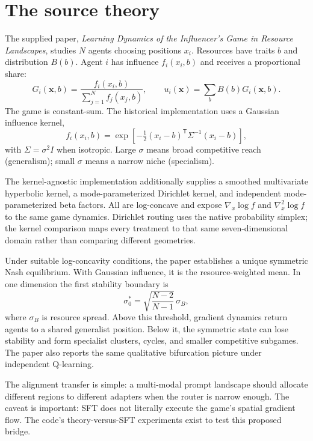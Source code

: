 \documentclass[11pt]{article}
\begin{document}
\section{The source theory}
The supplied paper, \emph{Learning Dynamics of the Influencer's Game in Resource
Landscapes}, studies $N$ agents choosing positions $x_i$. Resources have traits $b$ and
distribution $B(b)$. Agent $i$ has influence $f_i(x_i,b)$ and receives a proportional
share:
\begin{equation}
G_i(\mathbf{x},b)=\frac{f_i(x_i,b)}{\sum_{j=1}^{N}f_j(x_j,b)},\qquad
u_i(\mathbf{x})=\sum_b B(b)G_i(\mathbf{x},b).
\label{eq:game}
\end{equation}
The game is constant-sum. The historical implementation uses a Gaussian
influence kernel,
\begin{equation}
f_i(x_i,b)=\exp\!\left[-\tfrac12(x_i-b)^\mathsf{T}\Sigma^{-1}(x_i-b)\right],
\end{equation}
with $\Sigma=\sigma^2I$ when isotropic. Large $\sigma$ means broad competitive reach
(generalism); small $\sigma$ means a narrow niche (specialism).

The kernel-agnostic implementation additionally supplies a smoothed multivariate
hyperbolic kernel, a mode-parameterized Dirichlet kernel, and independent
mode-parameterized beta factors. All are log-concave and expose
$\nabla_x\log f$ and $\nabla_x^2\log f$ to the same game dynamics. Dirichlet routing
uses the native probability simplex; the kernel comparison maps every treatment to
that same seven-dimensional domain rather than comparing different geometries.

Under suitable log-concavity conditions, the paper establishes a unique symmetric Nash
equilibrium. With Gaussian influence, it is the resource-weighted mean. In one dimension
the first stability boundary is
\begin{equation}
\sigma_0^*=\sqrt{\frac{N-2}{N-1}}\,\sigma_B,
\label{eq:threshold}
\end{equation}
where $\sigma_B$ is resource spread. Above this threshold, gradient dynamics return
agents to a shared generalist position. Below it, the symmetric state can lose stability
and form specialist clusters, cycles, and smaller competitive subgames. The paper also
reports the same qualitative bifurcation picture under independent Q-learning.

The alignment transfer is simple: a multi-modal prompt landscape should allocate
different regions to different adapters when the router is narrow enough. The caveat is
important: SFT does not literally execute the game's spatial gradient flow. The code's
theory-versus-SFT experiments exist to test this proposed bridge.
\end{document}
